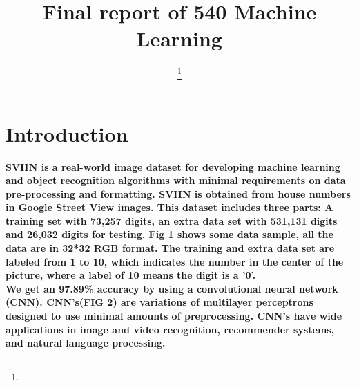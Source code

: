 \documentclass[twocolumn]{webofc}
\begin{document}
%
\title{Final report of 540 Machine Learning}
%
%

\author{ \fnsep\thanks{} \and
         
      }


%
\maketitle
%
\section*{Introduction}\label{sec:readme}
\textbf{SVHN is a real-world image dataset for developing machine learning and object recognition algorithms with minimal requirements on data pre-processing and formatting. SVHN is obtained from house numbers in Google Street View images. This dataset includes three parts: A training set with 73,257 digits, an extra data set with 531,131 digits and 26,032 digits for testing. Fig 1 shows some data sample, all the data are in 32*32 RGB format. The training and extra data set are labeled from 1 to 10, which indicates the number in the center of the picture, where a label of 10 means the digit is a '0'. \\
We get an 97.89\%  accuracy by using a convolutional neural network (CNN). CNN's(FIG 2) are variations of multilayer perceptrons designed to use minimal amounts of preprocessing. CNN's  have wide applications in image and video recognition, recommender systems, and natural language processing.
}
\end{document}

